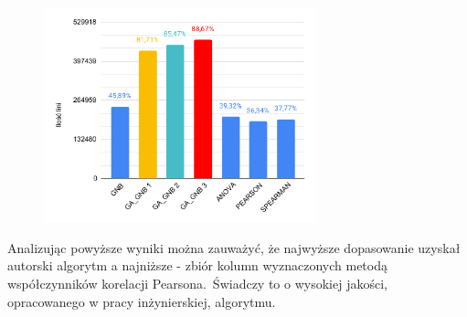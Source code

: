 \begin{figure}[H]
    \centering
    \includegraphics[width=0.7\textwidth]{images/Monday-WorkingHours_cmp}
    \label{fig:mond}
\end{figure}

Analizując powyższe wyniki można zauważyć, że najwyższe dopasowanie uzyskał autorski algorytm a najniższe - zbiór kolumn wyznaczonych metodą współczynników korelacji Pearsona.\ Świadczy to o wysokiej jakości, opracowanego w pracy inżynierskiej, algorytmu.

